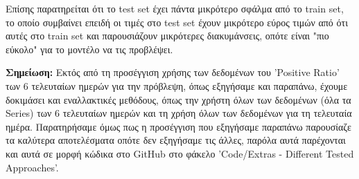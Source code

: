 \documentclass[12pt,a4paper]{article}
\begin{document}
Επίσης παρατηρείται ότι το test set έχει πάντα μικρότερο σφάλμα από το train set, το οποίο συμβαίνει επειδή οι τιμές στο test set έχουν μικρότερο εύρος τιμών από ότι αυτές στο train set και παρουσιάζουν μικρότερες διακυμάνσεις, οπότε είναι "πιο εύκολο" για το μοντέλο να τις προβλέψει.

\textbf{Σημείωση:} Εκτός από τη προσέγγιση χρήσης των δεδομένων του 'Positive Ratio' των 6 τελευταίων ημερών για την πρόβλεψη, όπως εξηγήσαμε και παραπάνω, έχουμε δοκιμάσει και εναλλακτικές μεθόδους, όπως την χρήστη όλων των δεδομένων (όλα τα Series) των 6 τελευταίων ημερών και τη χρήση όλων των δεδομένων για τη τελευταία ημέρα. Παρατηρήσαμε όμως πως η προσέγγιση που εξηγήσαμε παραπάνω παρουσίαζε τα καλύτερα αποτελέσματα οπότε δεν εξηγήσαμε τις άλλες, παρόλα αυτά παρέχονται και αυτά σε μορφή κώδικα στο GitHub στο φάκελο 'Code/Extras - Different Tested Approaches'.
\end{document}
